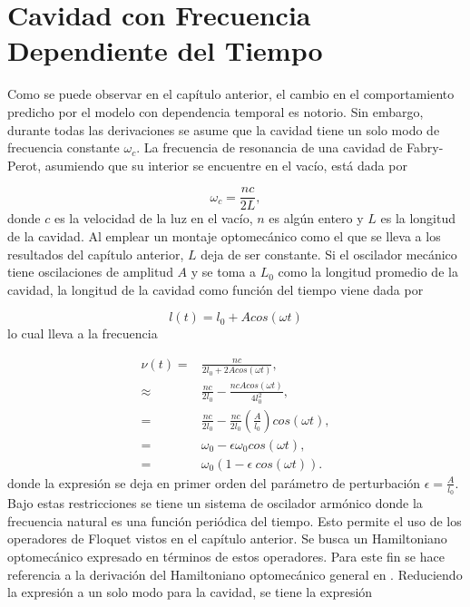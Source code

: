 \documentclass[10pt,a4paper]{report}
\begin{document}
\chapter{Cavidad con Frecuencia Dependiente del Tiempo}

Como se puede observar en el capítulo anterior, el cambio en el comportamiento predicho por el modelo con dependencia temporal es notorio. Sin embargo, durante todas las derivaciones se asume que la cavidad tiene un solo modo de frecuencia constante $\omega_c$. La frecuencia de resonancia de una cavidad de Fabry-Perot, asumiendo que su interior se encuentre en el vacío, está dada por

\begin{equation}
\omega_c = \frac{nc}{2L},
\end{equation} donde $c$ es la velocidad de la luz en el vacío, $n$ es algún entero y $L$ es la longitud de la cavidad. Al emplear un montaje optomecánico como el que se lleva a los resultados del capítulo anterior, $L$ deja de ser constante. Si el oscilador mecánico tiene oscilaciones de amplitud $A$ y se toma a $L_0$ como la longitud promedio de la cavidad, la longitud de la cavidad como función del tiempo viene dada por

\begin{equation}
l(t) = l_0 + A cos(\omega t)
\end{equation} lo cual lleva a la frecuencia 

\begin{align}
\nu(t) =& \frac{nc}{2l_0+2Acos(\omega t)}, \\
\approx& \frac{nc}{2l_0} - \frac{nc Acos(\omega t)}{4l_0^2}, \\
=& \frac{nc}{2l_0} - \frac{nc}{2l_0}(\frac{A}{l_0})cos(\omega t), \\
=& \omega_0 - \epsilon\omega_0 cos(\omega t), \\
=& \omega_0(1-\epsilon\ cos(\omega t)).
\end{align} donde la expresión se deja en primer orden del parámetro de perturbación $\epsilon = \frac{A}{l_0}$. Bajo estas restricciones se tiene un sistema de oscilador armónico donde la frecuencia natural es una función periódica del tiempo. Esto permite el uso de los operadores de Floquet vistos en el capítulo anterior. Se busca un Hamiltoniano optomecánico expresado en términos de estos operadores. Para este fin se hace referencia a la derivación del Hamiltoniano optomecánico general en \cite{LawOH}. Reduciendo la expresión a un solo modo para la cavidad, se tiene la expresión
\end{document}
